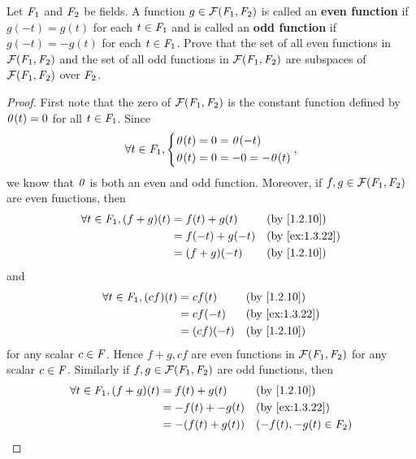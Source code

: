 \begin{ex}\label{ex:1.3.22}
	Let \(\mathit{F}_1\) and \(\mathit{F}_2\) be fields.
	A function \(g \in \fs{\F_1}{\F_2}\) is called an \textbf{even function} if \(g(-t) = g(t)\) for each \(t \in \mathit{F}_1\) and is called an \textbf{odd function} if \(g(-t) = -g(t)\) for each \(t \in \mathit{F}_1\).
	Prove that the set of all even functions in \(\fs{\F_1}{\F_2}\) and the set of all odd functions in \(\fs{\F_1}{\F_2}\) are subspaces of \(\fs{\F_1}{\F_2}\) over \(\mathit{F}_2\).
\end{ex}

\begin{proof}
	First note that the zero of \(\fs{\F_1}{\F_2}\) is the constant function defined by \(\mathit{0}(t) = 0\) for all \(t \in \mathit{F}_1\).
	Since
	\[
		\forall t \in \mathit{F}_1, \begin{dcases}
			\mathit{0}(t) = 0 = \mathit{0}(-t) \\
			\mathit{0}(t) = 0 = -0 = -\mathit{0}(t)
		\end{dcases},
	\]
	we know that \(\mathit{0}\) is both an even and odd function.
	Moreover, if \(f, g \in \fs{\F_1}{\F_2}\) are even functions, then
	\begin{align*}
		\forall t \in \F_1, (f + g)(t) & = f(t) + g(t)   &  & \text{(by \cref{1.2.10})}    \\
		                               & = f(-t) + g(-t) &  & \text{(by \cref{ex:1.3.22})} \\
		                               & = (f + g)(-t)   &  & \text{(by \cref{1.2.10})}
	\end{align*}
	and
	\begin{align*}
		\forall t \in \F_1, (cf)(t) & = cf(t)    &  & \text{(by \cref{1.2.10})}    \\
		                            & = cf(-t)   &  & \text{(by \cref{ex:1.3.22})} \\
		                            & = (cf)(-t) &  & \text{(by \cref{1.2.10})}
	\end{align*}
	for any scalar \(c \in \mathit{F}\).
	Hence \(f + g, cf\) are even functions in \(\fs{\F_1}{\F_2}\) for any scalar \(c \in \mathit{F}\).
	Similarly if \(f, g \in \fs{\F_1}{\F_2}\) are odd functions, then
	\begin{align*}
		\forall t \in \F_1, (f + g)(t) & = f(t) + g(t)    &  & \text{(by \cref{1.2.10})}    \\
		                               & = -f(t) + -g(t)  &  & \text{(by \cref{ex:1.3.22})} \\
		                               & = -(f(t) + g(t)) &  & (-f(t), -g(t) \in \F_2)      \\

\end{align*}
\end{proof}
